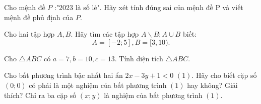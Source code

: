 \setcounter{bt}{0}



\begin{bt}%
	Cho mệnh đề $P$ :"2023 là số lẻ". Hãy xét tính đúng sai của mệnh đề $\mathrm{P}$ và viết mệnh đề phủ định của $P$.
\end{bt}	

\begin{bt}%
	Cho hai tập hợp $A, B$. Hãy tìm các tập hợp $A \backslash B ; A \cup B$ biết:
	$$
	A=[-2 ; 5], B=[3,10).
	$$
	\loigiai{
		$A=[-2 ; 5], B=[3,10)$ \\
		$A \backslash B=[-2 ; 3)$ \\
		$A \cup B=[-2 ; 10)$ 
	}
\end{bt}	
\begin{bt}	%
	Cho $\triangle A B C$ có $a=7, b=10, c=13$. Tính diện tích $\triangle A B C$.
\end{bt}	
\begin{bt}%
	Cho bất phương trình bậc nhất hai ẩn $2x-3y+1<0$ $(1)$. Hãy cho biết cặp số $(0;0)$ có phải là một nghiệm của bất phương trình $(1)$ hay không? Giải thích? Chỉ ra ba cặp số $(x;y)$ là nghiệm của bất phương trình $(1)$.
\end{bt}
